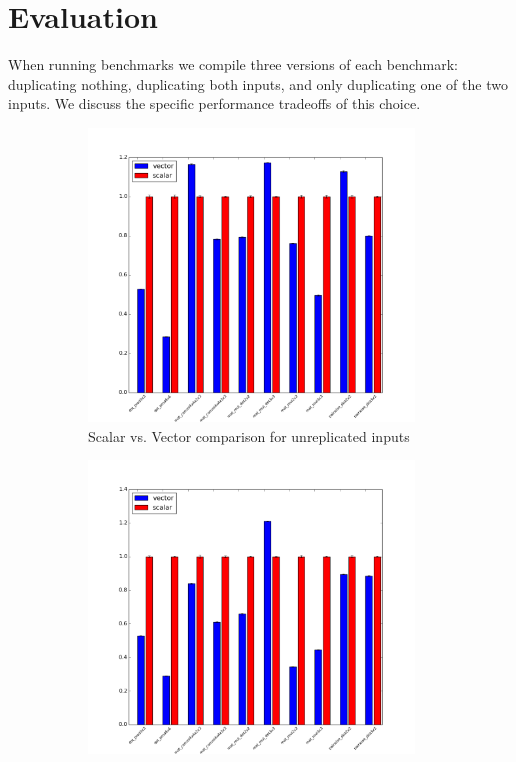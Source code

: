 \section{Evaluation}\label{sec:eval}
When running benchmarks we compile three versions of each benchmark: duplicating nothing, duplicating both inputs, and only duplicating one of the two inputs.
We discuss the specific performance tradeoffs of this choice.
\begin{figure}
    \begin{subfigure}{0.3\textwidth}
        \includegraphics[width=0.95\textwidth]{figures/graphs/DataUnreplicatedENC+RUN.png}
        \caption{Scalar vs. Vector comparison for unreplicated inputs}
    \end{subfigure}
    \begin{subfigure}{0.3\textwidth}
        \includegraphics[width=0.95\textwidth]{figures/graphs/DataPartiallyReplicatedENC+RUN.png}

\end{subfigure}
\end{figure}
